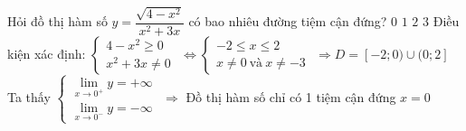 \begin{ex}%
	Hỏi đồ thị hàm số $y=\dfrac{\sqrt{4-x^2}}{x^2+3x}$ có bao nhiêu đường tiệm cận đứng?
	\choice
	{$0$}
	{\True $1$}
	{$2$}
	{$3$}
	\loigiai
	{Điều kiện xác định: $\begin{cases}
		4-x^2\ge 0\\ x^2+3x\neq 0
		\end{cases}$
		$\Leftrightarrow \begin{cases}
		-2\leq x\leq 2\\ x\neq 0\ \text{và}\ x\neq -3
		\end{cases}$
		$\Rightarrow D=[-2;0)\cup (0;2]$\\
		Ta thấy $\begin{cases}
		\lim\limits_{x\to 0^{+}}y=+\infty\\\lim\limits_{x\to 0^{-}}y=-\infty
		\end{cases}$
		$\Rightarrow$ Đồ thị hàm số chỉ có 1 tiệm cận đứng $x=0$}
\end{ex}

